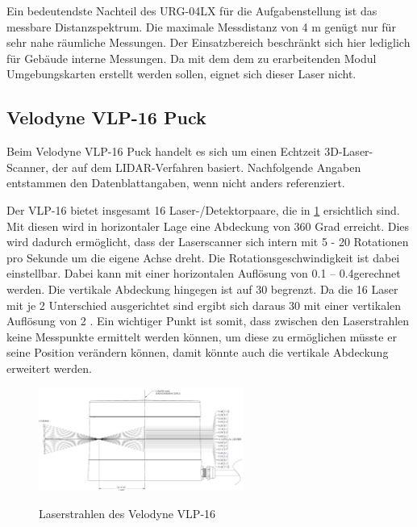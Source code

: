 Ein bedeutendste Nachteil des URG-04LX für die Aufgabenstellung ist das messbare Distanzspektrum. Die maximale Messdistanz von 4 m genügt nur für sehr nahe räumliche Messungen. Der Einsatzbereich beschränkt sich hier lediglich für Gebäude interne Messungen. Da mit dem dem zu erarbeitenden Modul Umgebungskarten erstellt werden sollen, eignet sich dieser Laser nicht.

\subsection{Velodyne VLP-16 Puck}
\label{subsec:Velodyne}
Beim Velodyne VLP-16 Puck handelt es sich um einen Echtzeit 3D-Laser-Scanner, der auf dem \ac{LIDAR}-Verfahren basiert. Nachfolgende Angaben entstammen den Datenblattangaben, wenn nicht anders referenziert. \protect\cite{velodyne}

Der VLP-16 bietet insgesamt 16 Laser-/Detektorpaare, die in \ref{fig:angleVLP} ersichtlich sind. Mit diesen wird in horizontaler Lage eine Abdeckung von 360 Grad erreicht. Dies wird dadurch ermöglicht, dass der Laserscanner sich intern mit 5 - 20 Rotationen pro Sekunde um die eigene Achse dreht. Die Rotationsgeschwindigkeit ist dabei einstellbar. Dabei kann mit einer horizontalen Auflösung von 0.1 \degrees – 0.4\degres gerechnet werden.
Die vertikale Abdeckung hingegen ist auf 30 \degres begrenzt. Da die 16 Laser mit je 2 \degres Unterschied ausgerichtet sind ergibt sich daraus 30 \degres mit einer vertikalen Auflösung von 2 \degres. Ein wichtiger Punkt ist somit, dass zwischen den Laserstrahlen keine Messpunkte ermittelt werden können, um diese zu ermöglichen müsste er seine Position verändern können, damit könnte auch die vertikale Abdeckung erweitert werden. 

\begin{figure}[H]
	\centering
	\includegraphics[width=0.6\textwidth]
	{resources/velodyne_channels.PNG}
	\caption[Laserstrahlen des Velodyne  VLP-16]{Laserstrahlen des Velodyne  VLP-16} \protect\cite{velodyne}
	\label{fig:angleVLP}
\end{figure}

